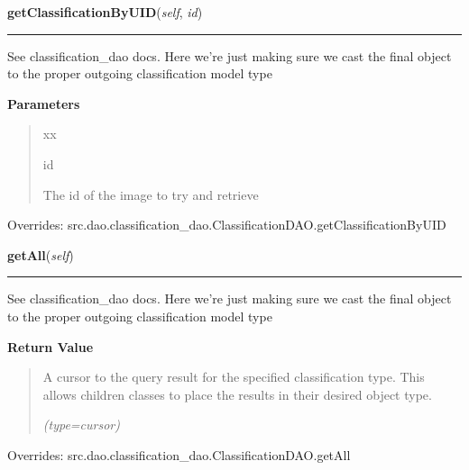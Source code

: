\hspace{.8\funcindent}\begin{boxedminipage}{\funcwidth}

    \raggedright \textbf{getClassificationByUID}(\textit{self}, \textit{id})

    \vspace{-1.5ex}

    \rule{\textwidth}{0.5\fboxrule}
\setlength{\parskip}{2ex}
    See classification\_dao docs. Here we're just making sure we cast the 
    final object to the proper outgoing classification model type

\setlength{\parskip}{1ex}
      \textbf{Parameters}
      \vspace{-1ex}

      \begin{quote}
        \begin{Ventry}{xx}

          \item[id]

          The id of the image to try and retrieve

        \end{Ventry}

      \end{quote}

      Overrides: src.dao.classification\_dao.ClassificationDAO.getClassificationByUID

    \end{boxedminipage}

    \vspace{0.5ex}

\hspace{.8\funcindent}\begin{boxedminipage}{\funcwidth}

    \raggedright \textbf{getAll}(\textit{self})

    \vspace{-1.5ex}

    \rule{\textwidth}{0.5\fboxrule}
\setlength{\parskip}{2ex}
    See classification\_dao docs. Here we're just making sure we cast the 
    final object to the proper outgoing classification model type

\setlength{\parskip}{1ex}
      \textbf{Return Value}
    \vspace{-1ex}

      \begin{quote}
      A cursor to the query result for the specified classification type. 
      This allows children classes to place the results in their desired 
      object type.

      {\it (type=cursor)}

      \end{quote}

      Overrides: src.dao.classification\_dao.ClassificationDAO.getAll

    \end{boxedminipage}

